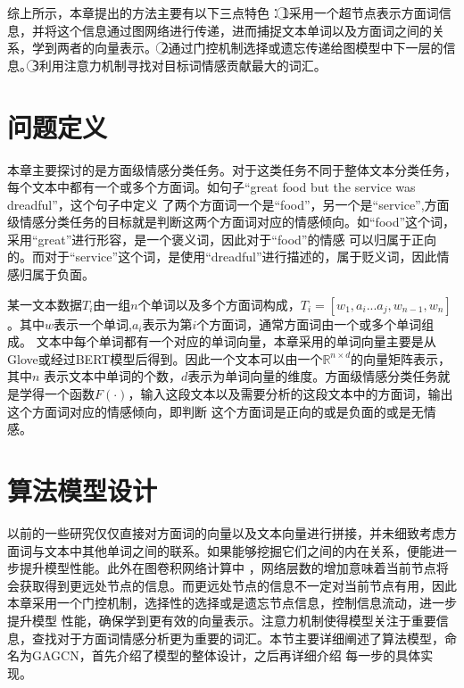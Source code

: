 综上所示，本章提出的方法主要有以下三点特色：\noindent\textcircled{1}采用一个超节点表示方面词信息，并将这个信息通过图网络进行传递，进而捕捉文本单词以及方面词之间的关系，学到两者的向量表示。
\noindent\textcircled{2}通过门控机制选择或遗忘传递给图模型中下一层的信息。\noindent\textcircled{3}利用注意力机制寻找对目标词情感贡献最大的词汇。

\section{问题定义}
本章主要探讨的是方面级情感分类任务。对于这类任务不同于整体文本分类任务，每个文本中都有一个或多个方面词。如句子“great food but the service was dreadful”，这个句子中定义
了两个方面词一个是“food”，另一个是“service”,方面级情感分类任务的目标就是判断这两个方面词对应的情感倾向。如“food”这个词，采用“great”进行形容，是一个褒义词，因此对于“food”的情感
可以归属于正向的。而对于“service”这个词，是使用“dreadful”进行描述的，属于贬义词，因此情感归属于负面。

某一文本数据$T_i$由一组$n$个单词以及多个方面词构成，$T_i=[w_1,a_{i}...a_{j},w_{n-1},w_n]$。其中$w$表示一个单词,$a_i$表示为第$i$个方面词，通常方面词由一个或多个单词组成。
文本中每个单词都有一个对应的单词向量，本章采用的单词向量主要是从Glove或经过BERT模型后得到。因此一个文本可以由一个$\mathbb{R}^{n\times d}$的向量矩阵表示，其中$n$
表示文本中单词的个数，$d$表示为单词向量的维度。方面级情感分类任务就是学得一个函数$F(\cdot)$，输入这段文本以及需要分析的这段文本中的方面词，输出这个方面词对应的情感倾向，即判断
这个方面词是正向的或是负面的或是无情感。

\section{算法模型设计}
以前的一些研究仅仅直接对方面词的向量以及文本向量进行拼接，并未细致考虑方面词与文本中其他单词之间的联系。如果能够挖掘它们之间的内在关系，便能进一步提升模型性能。此外在图卷积网络计算中
，网络层数的增加意味着当前节点将会获取得到更远处节点的信息。而更远处节点的信息不一定对当前节点有用，因此本章采用一个门控机制，选择性的选择或是遗忘节点信息，控制信息流动，进一步提升模型
性能，确保学到更有效的向量表示。注意力机制使得模型关注于重要信息，查找对于方面词情感分析更为重要的词汇。本节主要详细阐述了算法模型，命名为GAGCN，首先介绍了模型的整体设计，之后再详细介绍
每一步的具体实现。

